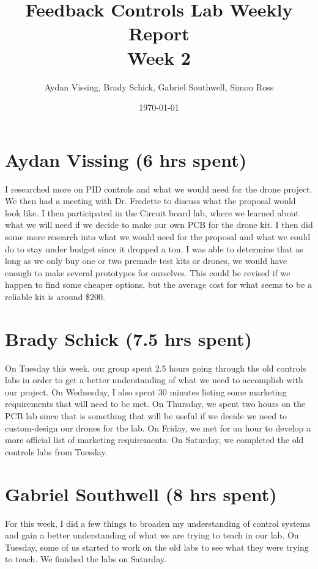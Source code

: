 \documentclass[12pt, titlepage]{article}
\title{Feedback Controls Lab Weekly Report \\ \normalsize{Week 2}}
\author{Aydan Vissing, Brady Schick, Gabriel Southwell, Simon Ross}
\date{\today}
\begin{document}
\maketitle

\section*{Aydan Vissing (6 hrs spent)}

I researched more on PID controls and what we would need for the drone project. We then had a meeting with Dr. Fredette to discuss what the proposal would look like. I then participated in the Circuit board lab, where we learned about what we will need if we decide to make our own PCB for the drone kit. I then did some more research into what we would need for the proposal and what we could do to stay under budget since it dropped a ton. I was able to determine that as long as we only buy one or two premade test kits or drones, we would have enough to make several prototypes for ourselves. This could be revised if we happen to find some cheaper options, but the average cost for what seems to be a reliable kit is around \$200.

\section*{Brady Schick (7.5 hrs spent)}

On Tuesday this week, our group spent 2.5 hours going through the old controls labs in order to get a better understanding of what we need to accomplish with our project. On Wednesday, I also spent 30 minutes listing some marketing requirements that will need to be met. On Thursday, we spent two hours on the PCB lab since that is something that will be useful if we decide we need to custom-design our drones for the lab. On Friday, we met for an hour to develop a more official list of marketing requirements. On Saturday, we completed the old controls labs from Tuesday.

\section*{Gabriel Southwell (8 hrs spent)}

For this week, I did a few things to broaden my understanding of control systems and gain a better understanding of what we are trying to teach in our lab. On Tuesday, some of us started to work on the old labs to see what they were trying to teach. We finished the labs on Saturday.
\end{document}
